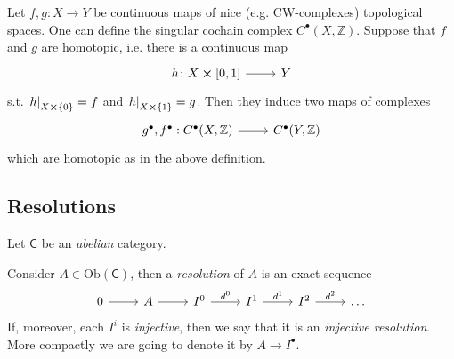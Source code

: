 \documentclass[../Main]{subfiles}
\begin{document}
\begin{rem}[]
	Let $f,g\colon X \to Y$ be continuous maps of nice (e.g. CW-complexes) topological spaces.
	One can define the singular cochain complex $C^\bullet(X,\mathbb{Z})$.
	Suppose that $f$ and $g$ are homotopic, i.e. there is a continuous map
	\begin{equation}
		\begin{tikzcd}
		h\colon X \cross \left[ 0,1 \right] \arrow[r, "", rightarrow] &
		Y
		\end{tikzcd}
	\end{equation} 
	s.t. $\left.h\right|_{X \cross \left\{ 0 \right\}} = f$ and
	$\left.h\right|_{X \cross \left\{ 1 \right\}} = g$.
	Then they induce two maps of complexes
	\begin{equation}
	\begin{tikzcd}
		g^\bullet, f^\bullet: C^\bullet(X, \mathbb{Z}) \arrow[r, "", rightarrow] &
		C^\bullet(Y, \mathbb{Z})
	\end{tikzcd}
	\end{equation} 
	which are homotopic as in the above definition.
\end{rem}

\subsection{Resolutions}
Let $\mathsf{C}$ be an {\em abelian} category.
\begin{defn}[Resolution]
	Consider $A \in \mathrm{Ob} \left(\mathsf{C}\right)$, then a {\em resolution}
	of $A$ is an exact sequence
	\begin{equation}
	\begin{tikzcd}
		0 \arrow[r, "", rightarrow] &
		A \arrow[r, "", rightarrow] &
		I^0 \arrow[r, "d^0", rightarrow] &
		I^1 \arrow[r, "d^1", rightarrow] &
		I^2 \arrow[r, "d^2", rightarrow] &
		\ldots
	\end{tikzcd}
	\end{equation}
	If, moreover, each $I^i$ is {\em injective}, then we say that
	it is an {\em injective resolution}.
	More compactly we are going to denote it by $A \to I^\bullet$.
\end{defn}
\end{document}
